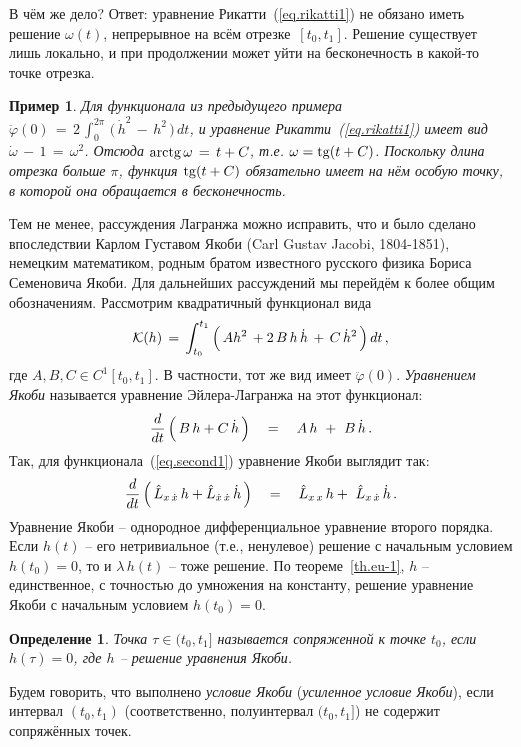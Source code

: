 \documentclass[12pt,a4paper]{article}
\newtheorem{ex}{Пример}
\newtheorem{defi}{Определение}
\newcommand{\cK}{{\cal{K}}}
\begin{document}
В чём же дело? Ответ: уравнение Рикатти~(\ref{eq.rikatti1}) не
обязано иметь решение $\omega(t)$, непрерывное на всём отрезке~$[t_0, t_1]$.
Решение существует лишь локально, и при продолжении может уйти на
бесконечность в какой-то точке отрезка.
\begin{ex}\label{ex.rikatti}
{\em Для функционала из предыдущего примера $\ddot \varphi(0) \, = \, 2\,
\int_{0}^{2\pi }\, \bigl( \, {\dot h}^2 \, - \, h^2\, \bigr)\, d
t$, и уравнение Рикатти~(\ref{eq.rikatti1}) имеет вид $\dot \omega
\, - \, 1 \, = \, \omega^2$. Отсюда ${\rm arctg}\, \omega\, = \, t
+ C$, т.е. $\omega = {\rm tg}(t+C)$. Поскольку  длина отрезка
больше $\pi$,  функция ${\rm tg}(t+C)$ обязательно имеет на нём особую
точку, в которой она обращается в бесконечность. }
\end{ex}


Тем не менее, рассуждения Лагранжа можно исправить, что и было
сделано впоследствии Карлом Густавом Якоби (Carl Gustav Jacobi, 1804-1851), немецким
математиком, родным братом известного русского физика Бориса Семеновича Якоби. Для дальнейших
рассуждений мы перейдём к более общим обозначениям. Рассмотрим
квадратичный функционал вида
$$
\cK(h)\, = \, \int_{t_0}^{t_1}\, \Bigl(\, Ah^2\, + 2\, B\, h \,
\dot h \, + \, C\, {\dot h}^2\, \Bigr)\, d t\, ,
$$
где $A, B, C\in C^1[t_0, t_1]$. В частности, тот же вид имеет
$\ddot \varphi(0)$. {\em Уравнением Якоби} называется уравнение
Эйлера-Лагранжа на этот функционал:
\begin{equation}\label{Jakobi-gen}
\frac{d}{dt}\, \Bigl(\, B\, h  +   C\, \dot h \, \Bigr)\quad =
\quad A\, h  \ +\  B\, \dot h\, .
\end{equation}
Так, для функционала~(\ref{eq.second1}) уравнение Якоби выглядит так:
\begin{equation}\label{Jakobi}
\frac{d}{dt}\, \Bigl(\, {\hat L}_{x \, \dot x}\, h  +   {\hat
L}_{\dot x \, \dot x}\, \dot h \, \Bigr)\quad = \quad {\hat L}_{x
\,  x}\, h  +\  {\hat L}_{x \, \dot x}\, \dot h\, .
\end{equation}
Уравнение Якоби -- однородное дифференциальное уравнение второго
порядка. Если $h(t)$ -- его нетривиальное (т.е., ненулевое)
решение с начальным условием $h(t_0)=0$, то и $\lambda\, h(t) $ --
тоже решение. По теореме~\ref{th.eu-1}, $h$ -- единственное, с точностью до
умножения на константу, решение уравнение Якоби с начальным
условием $h(t_0)=0$.
\begin{defi}\label{d.sopr}
Точка $\tau \in (t_0, t_1]$ называется сопряженной к точке $t_0$,
если $h(\tau)=0$, где $h$ -- решение уравнения Якоби.
\end{defi}
Будем говорить, что выполнено {\em условие Якоби} ({\em усиленное
условие Якоби}), если интервал $(t_0, t_1)$ (соответственно,
полуинтервал $(t_0, t_1]$) не содержит сопряжённых точек.
\end{document}

